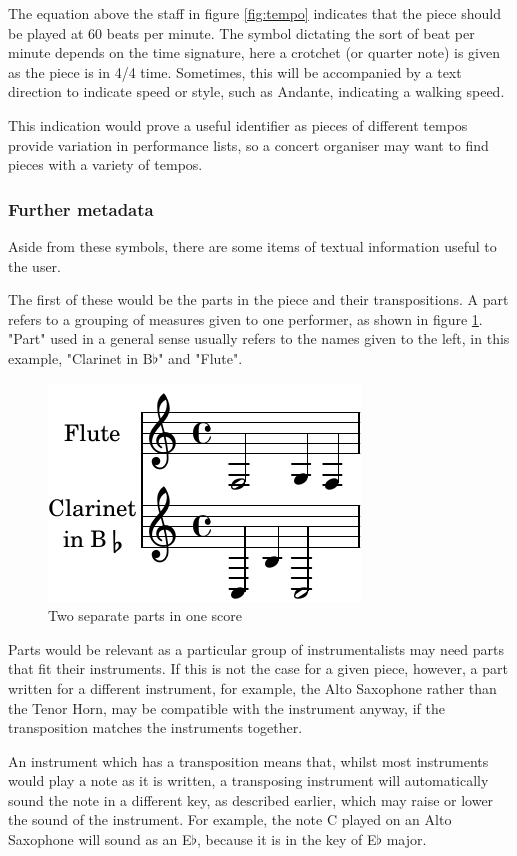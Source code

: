The equation above the staff in figure \ref{fig:tempo} indicates that the piece should be played at 60 beats per minute. The symbol dictating the sort of beat per minute depends on the time signature, here a crotchet (or quarter note) is given as the piece is in 4/4 time. Sometimes, this will be accompanied by a text direction to indicate speed or style, such as Andante, indicating a walking speed.

This indication would prove a useful identifier as pieces of different tempos provide variation in performance lists, so a concert organiser may want to find pieces with a variety of tempos.

\subsubsection{Further metadata}
Aside from these symbols, there are some items of textual information useful to the user. 

The first of these would be the parts in the piece and their transpositions. A part refers to a grouping of measures given to one performer, as shown in figure \ref{fig:parts}. "Part" used in a general sense usually refers to the names given to the left, in this example, "Clarinet in B$\flat$" and "Flute".
\begin{figure}[H]
\centering
\includegraphics{multiparts-crop}
\caption{Two separate parts in one score}
\label{fig:parts}	
\end{figure}



Parts would be relevant as a particular group of instrumentalists may need parts that fit their instruments. If this is not the case for a given piece, however, a part written for a different instrument, for example, the Alto Saxophone rather than the Tenor Horn, may be compatible with the instrument anyway, if the transposition matches the instruments together. 

An instrument which has a transposition means that, whilst most instruments would play a note as it is written, a transposing instrument will automatically sound the note in a different key, as described earlier, which may raise or lower the sound of the instrument. For example, the note C played on an Alto Saxophone will sound as an E$\flat$, because it is in the key of E$\flat$ major. 

